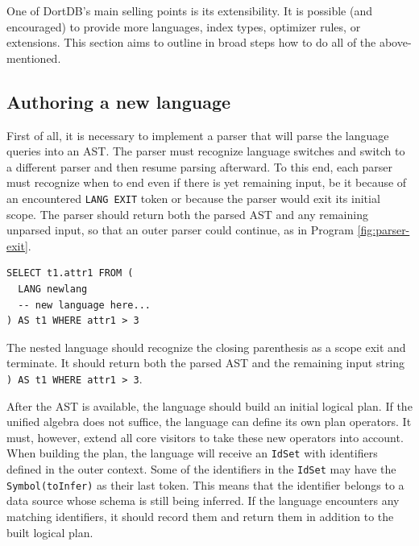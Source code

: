 One of DortDB's main selling points is its extensibility. It is possible (and encouraged) to provide more languages, index types, optimizer rules, or extensions. This section aims to outline in broad steps how to do all of the above-mentioned.

\subsection{Authoring a new language}

First of all, it is necessary to implement a parser that will parse the language queries into an AST. The parser must recognize language switches and switch to a different parser and then resume parsing afterward. To this end, each parser must recognize when to end even if there is yet remaining input, be it because of an encountered \texttt{LANG EXIT} token or because the parser would exit its initial scope. The parser should return both the parsed AST and any remaining unparsed input, so that an outer parser could continue, as in Program \ref{fig:parser-exit}.

\begin{listing}[!ht]
\begin{verbatim}
SELECT t1.attr1 FROM (
  LANG newlang
  -- new language here...
) AS t1 WHERE attr1 > 3
\end{verbatim}
\caption{The nested language should recognize the closing parenthesis as a scope exit and terminate. It should return both the parsed AST and the remaining input string \texttt{) AS t1 WHERE attr1 > 3}.}
\label{fig:parser-exit}
\end{listing}

After the AST is available, the language should build an initial logical plan. If the unified algebra does not suffice, the language can define its own plan operators. It must, however, extend all core visitors to take these new operators into account. When building the plan, the language will receive an \texttt{IdSet} with identifiers defined in the outer context. Some of the identifiers in the \texttt{IdSet} may have the \texttt{Symbol(toInfer)} as their last token. This means that the identifier belongs to a data source whose schema is still being inferred. If the language encounters any matching identifiers, it should record them and return them in addition to the built logical plan.

